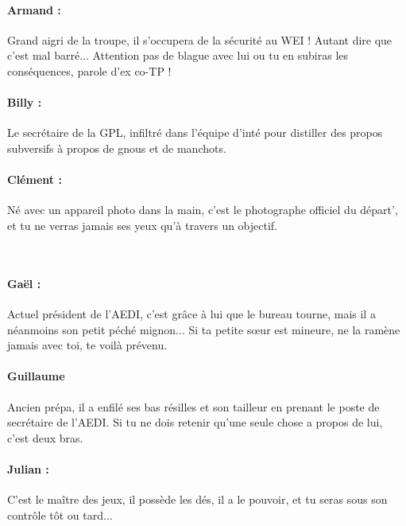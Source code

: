 \paragraph{Armand :} Grand aigri de la troupe, il s'occupera de la sécurité au WEI ! Autant dire que c'est mal barré... Attention pas de blague avec lui ou tu en subiras les conséquences, parole d'ex co-TP !

\paragraph{Billy :} Le secrétaire de la GPL, infiltré dans l'équipe d'inté pour distiller des propos subversifs à propos de gnous et de manchots.

\paragraph{Clément :} Né avec un appareil photo dans la main, c'est le photographe officiel du départ', et tu ne verras jamais ses yeux qu'à travers un objectif.

\columnbreak
~\\

\paragraph{Gaël :} Actuel président de l'AEDI, c'est grâce à lui que le bureau tourne, mais il a néanmoins son petit péché mignon... Si ta petite sœur est mineure, ne la ramène jamais avec toi, te voilà prévenu.

\paragraph{Guillaume} Ancien prépa, il a enfilé ses bas résilles et son tailleur en prenant le poste de secrétaire de l'AEDI. Si tu ne dois retenir qu'une seule chose a propos de lui, c'est deux bras.


\paragraph{Julian :} C'est le maître des jeux, il possède les dés, il a le pouvoir, et tu seras sous son contrôle tôt ou tard...

\clearpage
{}
